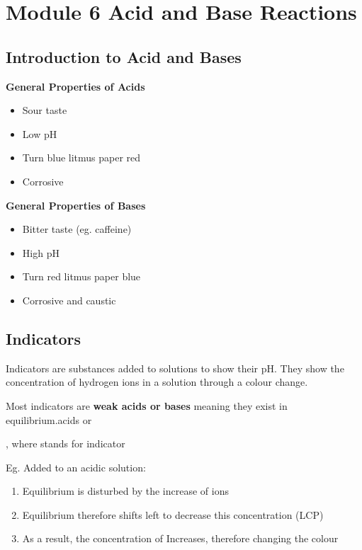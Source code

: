 
\chapter{Module 6 \hspace{0.5em} Acid and Base Reactions} \label{12/12/2024}

	\section{Introduction to Acid and Bases}
	
		\textbf{General Properties of Acids}
		
			\begin{itemize}
				\item Sour taste
				\item Low pH
				\item Turn blue litmus paper red
				\item Corrosive
			\end{itemize}

		\textbf{General Properties of Bases}
			
			\begin{itemize}
				\item Bitter taste (eg. caffeine)
				\item High pH
				\item Turn red litmus paper blue
				\item Corrosive and caustic
			\end{itemize}

	\section{Indicators}
	
		Indicators are substances added to solutions to show their pH. They show the concentration of hydrogen ions in a solution through a colour change.

		Most indicators are \textbf{weak acids or bases} meaning they exist in equilibrium.acids or

		\begin{center}
			, where  stands for indicator
		\end{center}

		Eg. Added to an acidic solution:
		\begin{enumerate}
			\item Equilibrium is disturbed by the increase of  ions
			\item Equilibrium therefore shifts left to decrease this concentration (LCP)
			\item As a result, the concentration of  Increases, therefore changing the colour
		\end{enumerate}

